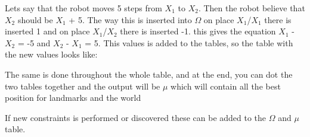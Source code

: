 
Lets say that the robot moves 5 steps from $X_1$ to $X_2$. Then the robot believe that $X_2$ should be $X_1$ + 5. The way this is inserted into $\Omega$ on place $X_1$/$X_1$ there is inserted 1 and on place $X_1$/$X_2$ there is inserted -1. this gives the equation $X_1$ - $X_2$ = -5 and $X_2$ - $X_1$ = 5. This values is added to the tables, so the table with the new values looks like:


The same is done throughout the whole table, and at the end, you can dot the two tables together and the output will be $\mu$ which will contain all the best position for landmarks and the world

If new constraints is performed or discovered these can be added to the $\Omega$ and $\mu$ table.